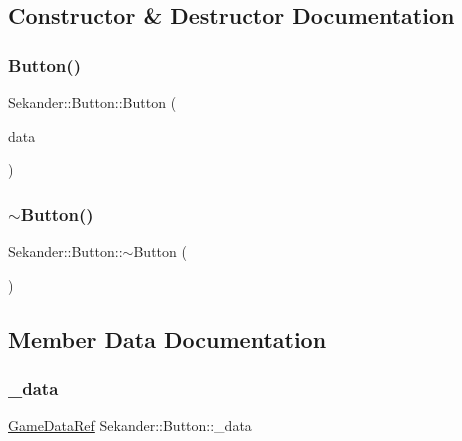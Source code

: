 \subsection{Constructor \& Destructor Documentation}
\mbox{\label{classSekander_1_1Button_a97a6651579e507d76aafcd5734b3df34}} 
\subsubsection{\texorpdfstring{Button()}{Button()}}
{\footnotesize\ttfamily Sekander\+::\+Button\+::\+Button (\begin{DoxyParamCaption}\item[{\hyperlink{namespaceSekander_a1d69b002ba2d23020901c28f0def5e16}{Game\+Data\+Ref}}]{data }\end{DoxyParamCaption})}

\mbox{\label{classSekander_1_1Button_a4c70ac65fcbc97dc548b57bc1ef87157}} 
\subsubsection{\texorpdfstring{$\sim$\+Button()}{~Button()}}
{\footnotesize\ttfamily Sekander\+::\+Button\+::$\sim$\+Button (\begin{DoxyParamCaption}{ }\end{DoxyParamCaption})}



\subsection{Member Data Documentation}
\mbox{\label{classSekander_1_1Button_a20e3f9a6f7533f122c793a5660305f8a}} 
\subsubsection{\texorpdfstring{\+\_\+data}{\_data}}
{\footnotesize\ttfamily \hyperlink{namespaceSekander_a1d69b002ba2d23020901c28f0def5e16}{Game\+Data\+Ref} Sekander\+::\+Button\+::\+\_\+data\hspace{0.3cm}{\ttfamily [private]}}

